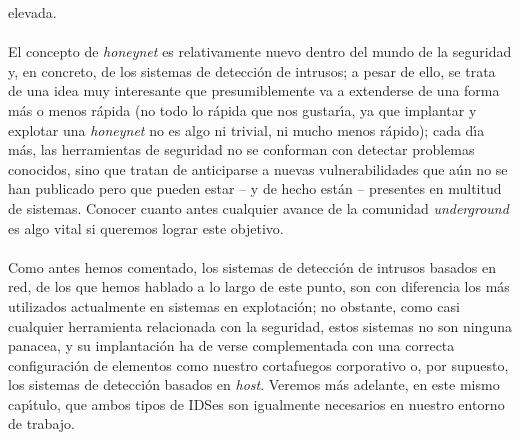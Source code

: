elevada.\\
\\El concepto de {\it honeynet} es relativamente nuevo dentro del mundo de la
seguridad y, en concreto, de los sistemas de detecci\'on de intrusos; a pesar de
ello, se trata de una idea muy interesante que presumiblemente va a extenderse
de una forma m\'as o menos r\'apida (no todo lo r\'apida que nos gustar\'{\i}a, 
ya que implantar y explotar una {\it honeynet} no es algo ni trivial, ni mucho
menos r\'apido); cada d\'{\i}a m\'as, las herramientas de seguridad no se
conforman con detectar problemas conocidos, sino que tratan de anticiparse a 
nuevas vulnerabilidades que a\'un no se han publicado pero que pueden estar -- 
y de hecho est\'an -- presentes en multitud de sistemas. Conocer cuanto antes 
cualquier avance de la comunidad {\it underground} es algo vital si queremos 
lograr este objetivo.\\
\\Como antes hemos comentado, los sistemas de detecci\'on de intrusos basados en
red, de los que hemos hablado a lo largo de este punto, son con diferencia los
m\'as utilizados actualmente en sistemas en explotaci\'on; no obstante, como
casi cualquier herramienta relacionada con la seguridad, estos sistemas no son
ninguna panacea, y su implantaci\'on ha de verse complementada con una correcta
configuraci\'on de elementos como nuestro cortafuegos corporativo o, por 
supuesto, los sistemas de detecci\'on basados en {\it host}. Veremos m\'as 
adelante, en este mismo cap\'{\i}tulo, que ambos tipos de IDSes son igualmente
necesarios en nuestro entorno de trabajo.
